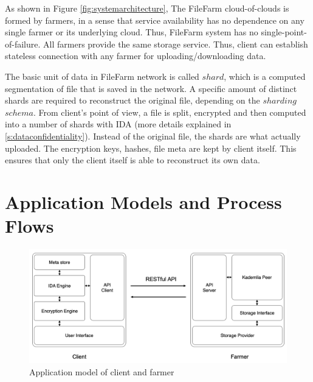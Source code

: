 As shown in Figure \ref{fig:systemarchitecture}, The FileFarm cloud-of-clouds is formed by farmers, in a sense that service availability has no dependence on any single farmer or its underlying cloud. Thus, FileFarm system has no single-point-of-failure. All farmers provide the same storage service. Thus, client can establish stateless connection with any farmer for uploading/downloading data.

The basic unit of data in FileFarm network is called $shard$, which is a computed segmentation of file that is saved in the network. A specific amount of distinct shards are required to reconstruct the original file, depending on the $sharding$ $schema$. From client's point of view, a file is split, encrypted and then computed into a number of shards with IDA (more details explained in \ref{s:dataconfidentiality}). Instead of the original file, the shards are what actually uploaded. The encryption keys, hashes, file meta are kept by client itself. This ensures that only the client itself is able to reconstruct its own data.

\newpage

\section{Application Models and Process Flows}
\label{s:applicationmodelsandprocessflows}

\begin{figure}[hbt]
\centering
  \includegraphics[width=14cm]{figures/application_models.png}
  \caption{Application model of client and farmer}
  \label{fig:applicationmodels}
\end{figure}

